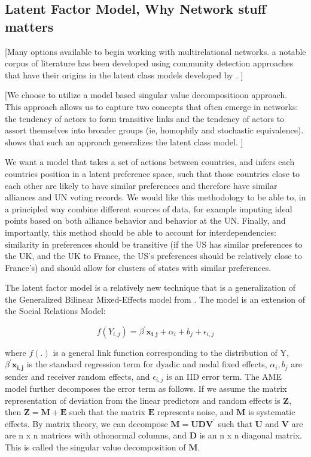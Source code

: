 \subsection*{Latent Factor Model, Why Network stuff matters}

[Many options available to begin working with multirelational networks. a notable corpus of literature has been developed using community detection approaches that have their origins in the latent class models developed by \citet{nowicki:snijders:2001}. ]

[We choose to utilize a model based singular value decompositioon approach. This approach allows us to capture two concepts that often emerge in networks: the tendency of actors to form transitive links and the tendency of actors to assort themselves into broader groups (ie, homophily and stochastic equivalence). \citet{hoff:2007} shows that such an approach generalizes  the latent class model. ]

We want a model that takes a set of actions between countries, and infers each countries position in a latent preference space, such that those countries close to each other are likely to have similar preferences and therefore have similar alliances and UN voting records. We would like this methodology to be able to, in a principled way combine different sources of data, for example imputing ideal points based on both alliance behavior and behavior at the UN. Finally, and importantly, this method should be able to account for interdependencies: similarity in preferences should be transitive (if the US has similar preferences to the UK, and the UK to France, the US's preferences should be relatively close to France's) and should allow for clusters of states with similar preferences.

The latent factor model is a relatively new technique that is a generalization of the Generalized Bilinear Mixed-Effects model from \citet{hoff:2005}. The model is an extension of the Social Relations Model: 

\begin{equation}
	f(Y_{i,j}) =  \beta^{'}\mathbf{x_{i,j}} + \alpha_{i} + b_{j} + \epsilon_{i,j}
\end{equation}

where $f(.)$ is a general link function corresponding to the distribution of Y, $\beta^{'}\mathbf{x_{i,j}}$ is the standard regression term for dyadic and nodal fixed effects,  $\alpha_{i}, b_{j}$ are sender and receiver random effects, and $\epsilon_{i,j}$ is an IID error term. The AME model further decomposes the  error term as follows. If we assume the matrix representation of deviation from the linear predictors and random effects is $\mathbf{Z}$, then $\mathbf{Z} = \mathbf{M} + \mathbf{E}$ such that the matrix $\mathbf{E}$ represents noise, and $\mathbf{M}$ is systematic effects. By matrix theory, we can decompose $\mathbf{M} = \mathbf{UDV^{'}}$ such that $\mathbf{U}$ and $\mathbf{V}$ are are n x n matrices with othonormal columns, and $\mathbf{D}$ is an n x n diagonal matrix. This is called the singular value decomposition of $\mathbf{M}$. 

